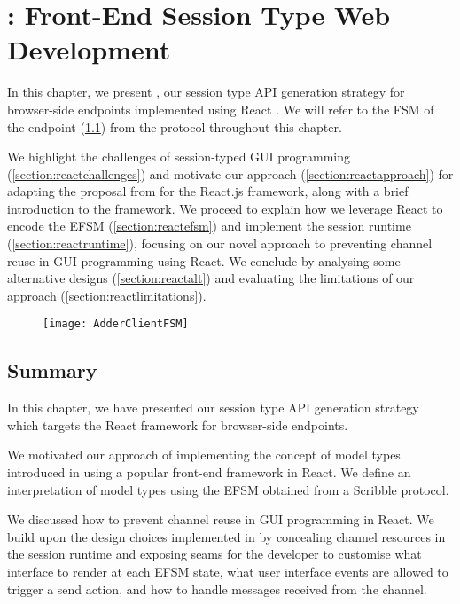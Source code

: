 \chapter{\reactcodegen: Front-End Session Type Web Development}
\label{chap:react}

In this chapter, we present \reactcodegen,
our session type API generation strategy for browser-side endpoints
implemented using React \cite{React}.
We will refer to the FSM of the 
endpoint (\cref{fig:adderclientfsm})
from the  protocol 
throughout this chapter.

We highlight the challenges of session-typed GUI programming
(\cref{section:reactchallenges}) and motivate 
our approach (\cref{section:reactapproach})
for adapting the proposal from
\cite{MVU2020} for the React.js framework, along with a brief
introduction to the framework.
We proceed to explain how we leverage React
to encode the EFSM (\cref{section:reactefsm})
and implement the session runtime (\cref{section:reactruntime}),
focusing on our novel approach to preventing
channel reuse in GUI programming using React.
We conclude by analysing some alternative designs
(\cref{section:reactalt})
and evaluating the limitations of our approach
(\cref{section:reactlimitations}).

\begin{figure}[!b]
\centering
\texttt{[image: AdderClientFSM]}
\label{fig:adderclientfsm}
\end{figure}








\section{Summary}
In this chapter, we have presented
our session type API generation strategy
which targets the React framework for browser-side endpoints.

We motivated our approach of
implementing the concept of model types introduced in \cite{MVU2020}
using a popular front-end framework in React.
We define an interpretation of model types
using the EFSM obtained from a Scribble protocol.

We discussed how to prevent channel reuse in
GUI programming in React. We build upon the design choices
implemented in \nodecodegen by concealing channel resources
in the session runtime and exposing seams for the developer
to customise what interface to render at each EFSM state,
what user interface events are allowed to trigger a send action,
and how to handle messages received from the channel.

